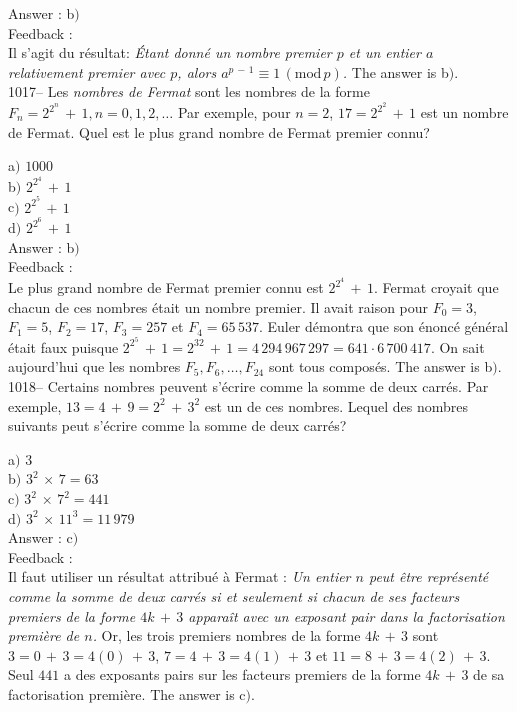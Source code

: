 \documentclass[letterpaper, 12pt]{article}
\begin{document}
Answer : b$)$\\

Feedback : \\
Il s'agit du r\'esultat: {\sl \'Etant donn\'e un nombre premier $p$
et un entier $a$ relativement premier avec $p$, alors
$a^{p\,-\,1}\equiv1\,(\mathrm{mod}\,p)$.}
The answer is b$)$.\\

1017-- Les {\sl nombres de Fermat} sont les nombres de la forme
$F_n=2^{2^n}\,+\,1, n=0,1,2,\ldots$ Par exemple, pour $n=2$,
$17=2^{2^2}\,+\,1$ est un nombre de Fermat. Quel est le plus grand
nombre de Fermat premier connu?

a$)$ $1000$ \\
b$)$ $2^{2^4}\,+\,1$ \\
c$)$ $2^{2^5}\,+\,1$ \\
d$)$ $2^{2^6}\,+\,1$\\

Answer : b$)$\\

Feedback : \\
Le plus grand nombre de Fermat premier connu est $2^{2^4}\,+\,1$.
Fermat croyait que chacun de ces nombres \'etait un nombre premier.
Il avait raison pour $F_0=3$, $F_1=5$, $F_2=17$, $F_3=257$ et
$F_4=65\,537$. Euler d\'emontra que son \'enonc\'e g\'en\'eral
\'etait faux puisque
$2^{2^5}\,+\,1=2^{32}\,+\,1=4\,294\,967\,297=641\cdot6\,700\,417$.
On sait aujourd'hui que les nombres $F_5,F_6,\ldots,F_{24}$ sont
tous compos\'es.
The answer is b$)$.\\

1018-- Certains nombres peuvent s'\'ecrire comme la somme de deux
carr\'es. Par exemple, $13=4\,+\,9=2^2\,+\,3^2$ est un de ces
nombres. Lequel des nombres suivants peut s'\'ecrire comme la somme
de deux carr\'es?

a$)$ $3$ \\
b$)$ $3^2\,\times\,7=63$\\
c$)$ $3^2\,\times\,7^2=441$ \\
d$)$ $3^2\,\times\,11^3=11\,979$\\

Answer : c$)$\\

Feedback : \\
Il faut utiliser un r\'esultat attribu\'e \`a Fermat : {\sl Un
entier $n$ peut \^etre repr\'esent\'e comme la somme de deux
carr\'es si et seulement si chacun de ses facteurs premiers de la
forme $4k\,+\,3$ appara\^it avec un exposant pair dans la
factorisation premi\`ere de $n$.} Or, les trois premiers nombres de
la forme $4k\,+\,3$ sont $3=0\,+\,3=4(0)\,+\,3$,
$7=4\,+\,3=4(1)\,+\,3$ et $11=8\,+\,3=4(2)\,+\,3$. Seul $441$ a des
exposants pairs sur les facteurs premiers de la forme $4k\,+\,3$ de
sa factorisation premi\`ere.
The answer is c$)$.\\
\end{document}
